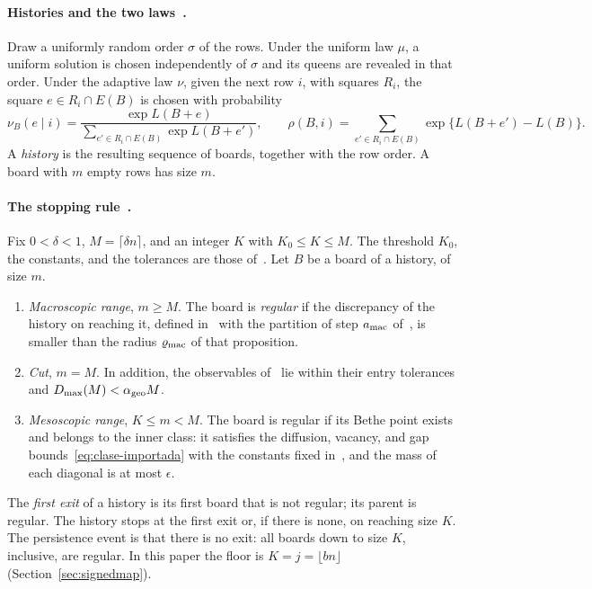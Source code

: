 \paragraph{Histories and the two laws~\cite[\S2]{tc}.} Draw a uniformly random order \(\sigma\) of the
rows. Under the uniform law \(\mu\), a uniform solution is chosen independently of \(\sigma\) and its
queens are revealed in that order. Under the adaptive law \(\nu\), given the next row \(i\), with squares
\(R_i\), the square \(e\in R_i\cap E(B)\) is chosen with probability
\[
 \nu_B(e\mid i)=\frac{\exp L(B+e)}{\sum_{e'\in R_i\cap E(B)}\exp L(B+e')},\qquad
 \rho(B,i)=\sum_{e'\in R_i\cap E(B)}\exp\{L(B+e')-L(B)\}.
\]
A \emph{history} is the resulting sequence of boards, together with the row order. A board with \(m\)
empty rows has size \(m\).

\paragraph{The stopping rule~\cite[Def.~2.2]{tc}.} Fix \(0<\delta<1\), \(M=\lceil\delta n\rceil\), and an
integer \(K\) with \(K_0\le K\le M\). The threshold \(K_0\), the constants, and the tolerances are those
of~\cite[\S5.4]{tc}. Let \(B\) be a board of a history, of size \(m\).
\begin{enumerate}
\item[(a)] \emph{Macroscopic range}, \(m\ge M\). The board is \emph{regular} if the discrepancy of the
history on reaching it, defined in~\cite[\S4.2]{tc} with the partition of step \(a_{\rm mac}\)
of~\cite[Prop.~4.11]{tc}, is smaller than the radius \(\varrho_{\rm mac}\) of that proposition.
\item[(b)] \emph{Cut}, \(m=M\). In addition, the observables of~\cite[\S5.3]{tc} lie within their entry
tolerances and \(D_{\max}(M)<\alpha_{\rm geo}M\).
\item[(c)] \emph{Mesoscopic range}, \(K\le m<M\). The board is regular if its Bethe point exists and
belongs to the inner class: it satisfies the diffusion, vacancy, and gap
bounds~\eqref{eq:clase-importada} with the constants fixed in~\cite[\S5.4]{tc}, and the mass of each
diagonal is at most \(\epsilon\).
\end{enumerate}
The \emph{first exit} of a history is its first board that is not regular; its parent is regular. The
history stops at the first exit or, if there is none, on reaching size \(K\). The persistence event is
that there is no exit: all boards down to size \(K\), inclusive, are regular. In this paper the floor is
\(K=j=\lfloor bn\rfloor\) (Section~\ref{sec:signedmap}).
